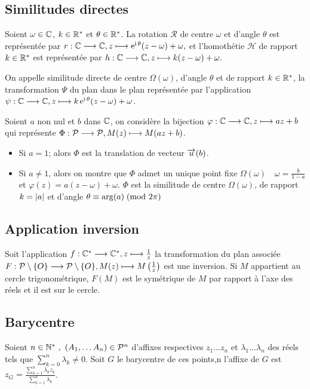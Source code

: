 \subsection{Similitudes directes}
\label{subsec:simdirecte}
Soient \(\omega \in \mathbb{C}\), \(k\in \mathbb{R}^*\) et \(\theta \in \mathbb{R}^*\). La rotation 
\(\mathcal{R}\) de centre \(\omega\) et d'angle \(\theta\) est représentée par 
\(r:\mathbb{C} \longrightarrow \mathbb{C}, z \longmapsto \operatorname{e}^{\operatorname{i} \theta}(z-\omega)+\omega,\) et l'homothétie 
\(\mathcal{H}\) de rapport \(k \in \mathbb{R}^*\) est représentée par 
\(h:\mathbb{C} \longrightarrow \mathbb{C}, z \longmapsto k(z-\omega)+\omega.\)
\begin{defdef}
    On appelle similitude directe de centre \(\Omega(\omega)\), d'angle 
    \(\theta\) et de rapport \(k \in \mathbb{R}^*\), la transformation \(\Psi\) du plan 
    dans le plan représentée par l'application 
    \(\psi:\mathbb{C} \longrightarrow \mathbb{C}, z \longmapsto k \operatorname{e}^{\operatorname{i} \theta}(z-\omega)+\omega\).
\end{defdef}
Soient \(a\) non nul et \(b\) dans \(\mathbb{C}\), on considère la bijection 
\(\varphi:\mathbb{C} \longrightarrow \mathbb{C}, z \longmapsto az+b\) qui représente 
\(\Phi:\mathcal{P} \longrightarrow \mathcal{P}, M(z) \longmapsto M(az+b)\).
\begin{itemize}
    \item Si \(a=1\); alors  \(\Phi\) est la translation de vecteur \(\overrightarrow{u}(b)\).
    \item Si \(a \neq 1\), alors on montre que \(\Phi\) admet un unique point 
        fixe \(\Omega(\omega) \quad \omega = \frac{b}{1-a}\) et 
        \(\varphi(z)=a(z-\omega)+\omega\).
        \(\Phi\) est la similitude de centre \(\Omega(\omega)\), de rapport 
        \(k=\left\lvert a\right\rvert\) et d'angle \(\theta \equiv \arg(a)\!\pmod {2\pi}\)
\end{itemize}
\subsection{Application inversion}
\label{subsec:appinverse}
Soit l'application \(f:\mathbb{C}^* \longrightarrow \mathbb{C}^*, z \longmapsto \frac{1}{z}\) la 
transformation du plan associée \(F:\mathcal{P} \setminus\{O\} \longrightarrow \mathcal{P} 
\setminus\{O\}, M(z) \longmapsto M \left( \frac{1}{z} \right)\) est une inversion. Si 
\(M\) appartient au cercle trigonométrique, \(F(M)\) est le symétrique de \(M\) 
par rapport à l'axe des réels et il est sur le cercle.
\subsection{Barycentre}
\label{subsec:complexebarycentre}
Soient \(n \in \mathbb{N}^{*} \ , \ (A_1, \ldots A_n) \in \mathcal{P}^n\)  d'affixes respectives 
\(z_1 \ldots z_n\) et \(\lambda_1 \ldots \lambda_n\) des réels tels que 
\(\sum_{k=0}^{n} \lambda_k \neq 0\). Soit \(G\) le barycentre de ces points,n 
l'affixe de \(G\) est \(z_G=\frac{\sum_{k=1}^{n}\lambda_k 
z_k}{\sum_{k=1}^{n}\lambda_k}\).
